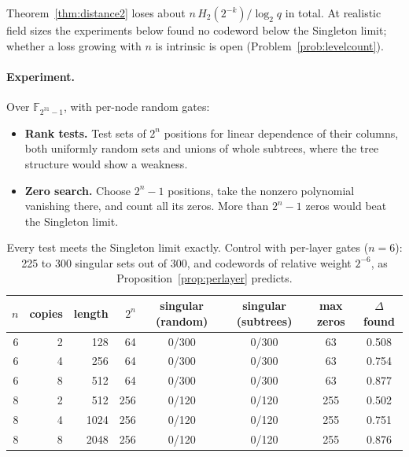 \documentclass[11pt]{article}
\theoremstyle{definition}
\begin{document}
Theorem~\ref{thm:distance2} loses about $n\,H_2(2^{-k})/\log_2q$ in total. At realistic field
sizes the experiments below found no codeword below the Singleton limit; whether a loss growing
with $n$ is intrinsic is open (Problem~\ref{prob:levelcount}).

\paragraph{Experiment.} Over $\mathbb{F}_{2^{31}-1}$, with per-node random gates:
\begin{itemize}[leftmargin=*]
\item \textbf{Rank tests.} Test sets of $2^n$ positions for linear dependence of their columns,
both uniformly random sets and unions of whole subtrees, where the tree structure would show a
weakness.
\item \textbf{Zero search.} Choose $2^n-1$ positions, take the nonzero polynomial vanishing there,
and count all its zeros. More than $2^n-1$ zeros would beat the Singleton limit.
\end{itemize}

\begin{table}[h]
\centering
\begin{tabular}{rrrrcccc}
\toprule
$n$ & copies & length & $2^n$ & singular (random) & singular (subtrees) & max zeros & $\Delta$ found\\
\midrule
6 & 2 & 128 & 64 & 0/300 & 0/300 & 63 & 0.508\\
6 & 4 & 256 & 64 & 0/300 & 0/300 & 63 & 0.754\\
6 & 8 & 512 & 64 & 0/300 & 0/300 & 63 & 0.877\\
8 & 2 & 512 & 256 & 0/120 & 0/120 & 255 & 0.502\\
8 & 4 & 1024 & 256 & 0/120 & 0/120 & 255 & 0.751\\
8 & 8 & 2048 & 256 & 0/120 & 0/120 & 255 & 0.876\\
\bottomrule
\end{tabular}
\caption{Every test meets the Singleton limit exactly. Control with per-layer gates ($n=6$):
225 to 300 singular sets out of 300, and codewords of relative weight $2^{-6}$, as
Proposition~\ref{prop:perlayer} predicts.}
\label{tab:m31}
\end{table}
\end{document}
